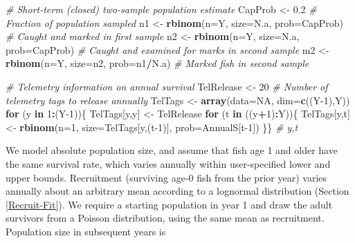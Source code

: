 \documentclass[
]{krantz}
\makeatletter
\newenvironment{Shaded}{\begin{snugshade}}{\end{snugshade}}
\newcommand{\AttributeTok}[1]{\textcolor[rgb]{0.27,0.27,0.27}{#1}}
\newcommand{\CommentTok}[1]{\textcolor[rgb]{0.37,0.37,0.37}{\textit{#1}}}
\newcommand{\ConstantTok}[1]{\textcolor[rgb]{0.37,0.37,0.37}{#1}}
\newcommand{\ControlFlowTok}[1]{\textcolor[rgb]{0.27,0.27,0.27}{\textbf{#1}}}
\newcommand{\DecValTok}[1]{\textcolor[rgb]{0.06,0.06,0.06}{#1}}
\newcommand{\FloatTok}[1]{\textcolor[rgb]{0.06,0.06,0.06}{#1}}
\newcommand{\FunctionTok}[1]{\textcolor[rgb]{0.27,0.27,0.27}{\textbf{#1}}}
\newcommand{\NormalTok}[1]{#1}
\newcommand{\OtherTok}[1]{\textcolor[rgb]{0.37,0.37,0.37}{#1}}
\newcommand{\SpecialCharTok}[1]{\textcolor[rgb]{0.43,0.43,0.43}{\textbf{#1}}}
\newenvironment{kframe}{%
\medskip{}
\setlength{\fboxsep}{.8em}
 \def\at@end@of@kframe{}%
 \ifinner\ifhmode%
  \def\at@end@of@kframe{\end{minipage}}%
  \begin{minipage}{\columnwidth}%
 \fi\fi%
 \def\FrameCommand##1{\hskip\@totalleftmargin \hskip-\fboxsep
 \colorbox{shadecolor}{##1}\hskip-\fboxsep
     \hskip-\linewidth \hskip-\@totalleftmargin \hskip\columnwidth}%
 \MakeFramed {\advance\hsize-\width
   \@totalleftmargin\z@ \linewidth\hsize
   \@setminipage}}%
 {\par\unskip\endMakeFramed%
 \at@end@of@kframe}
\renewenvironment{Shaded}{\begin{kframe}}{\end{kframe}}
\makeatother
\begin{document}
\begin{Shaded}
\begin{Highlighting}[]
\CommentTok{\# Short{-}term (closed) two{-}sample population estimate}
\NormalTok{CapProb }\OtherTok{\textless{}{-}} \FloatTok{0.2} \CommentTok{\# Fraction of population sampled}
\NormalTok{n1 }\OtherTok{\textless{}{-}} \FunctionTok{rbinom}\NormalTok{(}\AttributeTok{n=}\NormalTok{Y, }\AttributeTok{size=}\NormalTok{N.a, }\AttributeTok{prob=}\NormalTok{CapProb) }
  \CommentTok{\# Caught and marked in first sample}
\NormalTok{n2 }\OtherTok{\textless{}{-}} \FunctionTok{rbinom}\NormalTok{(}\AttributeTok{n=}\NormalTok{Y, }\AttributeTok{size=}\NormalTok{N.a, }\AttributeTok{prob=}\NormalTok{CapProb) }
  \CommentTok{\# Caught and examined for marks in second sample}
\NormalTok{m2 }\OtherTok{\textless{}{-}} \FunctionTok{rbinom}\NormalTok{(}\AttributeTok{n=}\NormalTok{Y, }\AttributeTok{size=}\NormalTok{n2, }\AttributeTok{prob=}\NormalTok{n1}\SpecialCharTok{/}\NormalTok{N.a) }\CommentTok{\# Marked fish in second sample}

\CommentTok{\# Telemetry information on annual survival}
\NormalTok{TelRelease }\OtherTok{\textless{}{-}} \DecValTok{20} \CommentTok{\# Number of telemetry tags to release annually}
\NormalTok{TelTags }\OtherTok{\textless{}{-}} \FunctionTok{array}\NormalTok{(}\AttributeTok{data=}\ConstantTok{NA}\NormalTok{, }\AttributeTok{dim=}\FunctionTok{c}\NormalTok{((Y}\DecValTok{{-}1}\NormalTok{),Y))}
\ControlFlowTok{for}\NormalTok{ (y }\ControlFlowTok{in} \DecValTok{1}\SpecialCharTok{:}\NormalTok{(Y}\DecValTok{{-}1}\NormalTok{))\{}
\NormalTok{  TelTags[y,y] }\OtherTok{\textless{}{-}}\NormalTok{ TelRelease}
  \ControlFlowTok{for}\NormalTok{ (t }\ControlFlowTok{in}\NormalTok{ ((y}\SpecialCharTok{+}\DecValTok{1}\NormalTok{)}\SpecialCharTok{:}\NormalTok{Y))\{}
\NormalTok{    TelTags[y,t] }\OtherTok{\textless{}{-}} \FunctionTok{rbinom}\NormalTok{(}\AttributeTok{n=}\DecValTok{1}\NormalTok{, }\AttributeTok{size=}\NormalTok{TelTags[y,(t}\DecValTok{{-}1}\NormalTok{)], }
                           \AttributeTok{prob=}\NormalTok{AnnualS[t}\DecValTok{{-}1}\NormalTok{])}
\NormalTok{  \}\} }\CommentTok{\# y,t}
\end{Highlighting}
\end{Shaded}

We model absolute population size, and assume that fish age 1 and older have the same survival rate, which varies annually within user-specified lower and upper bounds. Recruitment (surviving age-0 fish from the prior year) varies annually about an arbitrary mean according to a lognormal distribution (Section \ref{Recruit-Fit}). We require a starting population in year 1 and draw the adult survivors from a Poisson distribution, using the same mean as recruitment. Population size in subsequent years is
\end{document}
